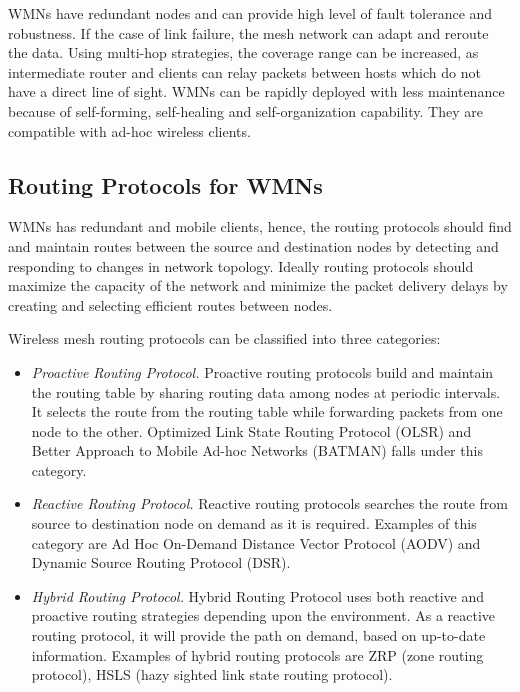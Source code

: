 WMNs have redundant nodes and can provide high level of fault tolerance and robustness. If the case of link failure, the mesh network can adapt and reroute the data. Using multi-hop strategies, the coverage range can be increased, as intermediate router and clients can relay packets between hosts which do not have a direct line of sight. WMNs can be rapidly deployed with less maintenance because of self-forming, self-healing and self-organization capability. They are compatible with ad-hoc wireless clients.


\subsection{Routing Protocols for WMNs}

WMNs has redundant and mobile clients, hence, the routing protocols should find and maintain routes between the source and destination nodes by detecting and responding to changes in network topology. Ideally routing protocols should maximize the capacity of the network and minimize the packet delivery delays by creating and selecting efficient routes between nodes.

Wireless mesh routing protocols can be classified into three categories:

\begin{itemize}
	\item \textit{Proactive Routing Protocol.} Proactive routing protocols build and maintain the routing table by sharing routing data among nodes at periodic intervals. It selects the route from the routing table while forwarding packets from one node to the other. Optimized Link State Routing Protocol (OLSR) and Better Approach to Mobile Ad-hoc Networks (BATMAN) falls under this category.
	\item \textit{Reactive Routing Protocol.}  Reactive routing protocols searches the route from source to destination node on demand as it is required. Examples of this category are Ad Hoc On-Demand Distance Vector Protocol (AODV) and Dynamic Source Routing Protocol (DSR).
	\item \textit{Hybrid Routing Protocol.} Hybrid Routing Protocol uses both reactive and proactive routing strategies depending upon the environment. As a reactive routing protocol, it will provide the path on demand, based on up-to-date information. Examples of hybrid routing protocols are ZRP (zone routing protocol), HSLS (hazy sighted link state routing protocol).
\end{itemize}

